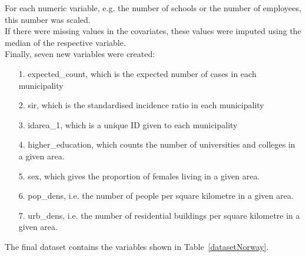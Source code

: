For each numeric variable, e.g. the number of schools or the number of employees, this number was scaled. \\
If there were missing values in the covariates, these values were imputed using the median of the respective variable. \\
Finally, seven new variables were created:
\begin{itemize}
    \item[1.] expected\_count, which is the expected number of cases in each municipality
    \item[2.] sir, which is the standardised incidence ratio in each municipality
    \item[3.] idarea\_1, which is a unique ID given to each municipality
    \item[4.] higher\_education, which counts the number of universities and colleges in a given area.
    \item[5.] sex, which gives the proportion of females living in a given area.
    \item[6.] pop\_dens, i.e. the number of people per square kilometre in a given area.
    \item[7.] urb\_dens, i.e. the number of residential buildings per square kilometre in a given area.
\end{itemize}
The final dataset contains the variables shown in Table~\ref{datasetNorway}.
